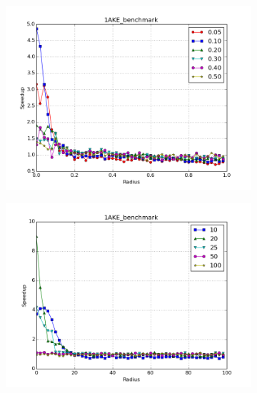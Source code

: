 \documentclass[review,preprint,12pt]{elsarticle}
\theoremstyle{definition}
\theoremstyle{remark}
\numberwithin{equation}{section}
\begin{document}
\begin{figure}[tbp]
\begin{subfigure}[b]{0.40\textwidth}
        \includegraphics[width=1\textwidth]{assets/1AKE_benchmark_cosine}
    \end{subfigure}%
    \begin{subfigure}[b]{0.40\textwidth}
        \includegraphics[width=1\textwidth]{assets/1AKE_benchmark_euclid}
    \end{subfigure}
    \begin{subfigure}[b]{0.40\textwidth}

\end{subfigure}
\end{figure}
\end{document}
